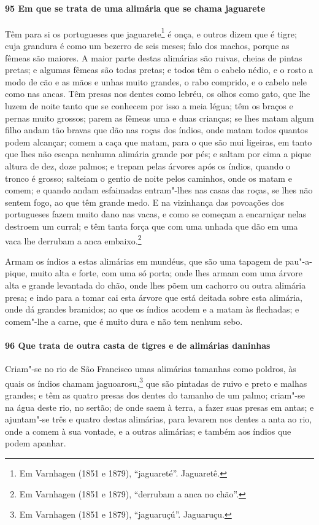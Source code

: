 \begin{linenumbers}
\paragraph{95 Em que se trata de uma alimária que se chama jaguarete}\quad
Têm para si os portugueses que jaguarete\footnote{ Em Varnhagen (1851 e 1879),
``jaguareté''. Jaguaretê.} é onça, e outros dizem que é tigre; cuja grandura é como um
bezerro de seis meses; falo dos machos, porque as fêmeas são maiores. A maior parte destas
alimárias são ruivas, cheias de pintas pretas; e algumas fêmeas são todas pretas; e todos
têm o cabelo nédio, e o rosto a modo de cão e as mãos e unhas muito grandes, o rabo
comprido, e o cabelo nele como nas ancas. Têm presas nos dentes como lebréu, os olhos como
gato, que lhe luzem de noite tanto que se conhecem por isso a meia légua; têm os braços e
pernas muito grossos; parem as fêmeas uma e duas crianças; se lhes matam algum filho andam
tão bravas que dão nas roças dos índios, onde matam todos quantos podem alcançar; comem a
caça que matam, para o que são mui ligeiras, em tanto que lhes não escapa nenhuma alimária
grande por pés; e saltam por cima a pique altura de dez, doze palmos; e trepam pelas
árvores após os índios, quando o tronco é grosso; salteiam o gentio de noite pelos
caminhos, onde os matam e comem; e quando andam esfaimadas entram"-lhes nas casas das
roças, se lhes não sentem fogo, ao que têm grande medo. E na vizinhança das povoações dos
portugueses fazem muito dano nas vacas, e como se começam a encarniçar nelas destroem um
curral; e têm tanta força que com uma unhada que dão em uma vaca lhe derrubam a anca
embaixo.\footnote{ Em Varnhagen (1851 e 1879), ``derrubam a anca no chão''.}

Armam os índios a estas alimárias em mundéus, que são uma tapagem de pau"-a-pique, muito
alta e forte, com uma só porta; onde lhes armam com uma árvore alta e grande levantada do
chão, onde lhes põem um cachorro ou outra alimária presa; e indo para a tomar cai esta
árvore que está deitada sobre esta alimária, onde dá grandes bramidos; ao que os índios
acodem e a matam às flechadas; e comem"-lhe a carne, que é muito dura e não tem nenhum
sebo.

\paragraph{96 Que trata de outra casta de tigres e de alimárias daninhas}\quad
Criam"-se no rio de São Francisco umas alimárias tamanhas como poldros, às quais os índios
chamam jaguoarosu,\footnote{ Em Varnhagen (1851 e 1879), ``jaguaruçú''. Jaguaruçu.} que
são pintadas de ruivo e preto e malhas grandes; e têm as quatro presas dos dentes do
tamanho de um palmo; criam"-se na água deste rio, no sertão; de onde saem à terra, a fazer
suas presas em antas; e ajuntam"-se três e quatro destas alimárias, para levarem nos dentes
a anta ao rio, onde a comem à sua vontade, e a outras alimárias; e também aos índios que
podem apanhar.


\end{linenumbers}
